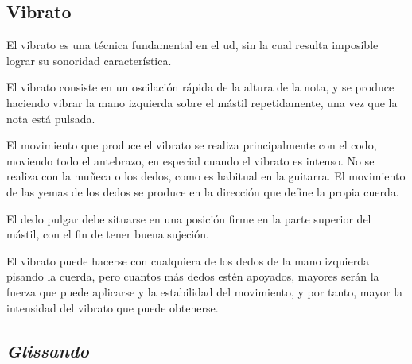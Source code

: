 \subsection{Vibrato}

El vibrato es una técnica fundamental en el ud, sin la cual resulta imposible lograr su sonoridad característica.

El vibrato consiste en un oscilación rápida de la altura de la nota, y se produce haciendo vibrar la mano izquierda sobre el mástil repetidamente, una vez que la nota está pulsada.

El movimiento que produce el vibrato se realiza principalmente con el codo, moviendo todo el antebrazo, en especial cuando el vibrato es intenso. No se realiza con la muñeca o los dedos, como es habitual en la guitarra. El movimiento de las yemas de los dedos se produce en la dirección que define la propia cuerda.

El dedo pulgar debe situarse en una posición firme en la parte superior del mástil, con el fin de tener buena sujeción.

El vibrato puede hacerse con cualquiera de los dedos de la mano izquierda pisando la cuerda, pero cuantos más dedos estén apoyados, mayores serán la fuerza que puede aplicarse y la estabilidad del movimiento, y por tanto, mayor la intensidad del vibrato que puede obtenerse.

\begin{center}
\end{center}




\subsection{\emph{Glissando}}

